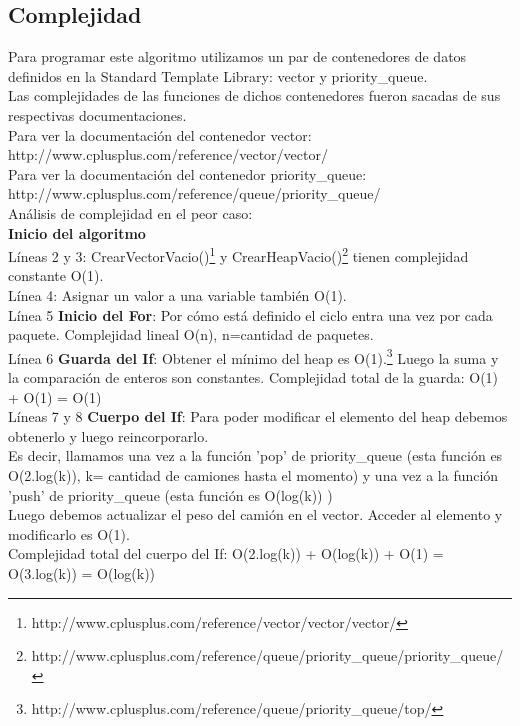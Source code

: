 \subsection{Complejidad}
Para programar este algoritmo utilizamos un par de contenedores de datos definidos en la Standard Template Library: vector y priority\_queue. \\
Las complejidades de las funciones de dichos contenedores fueron sacadas de sus respectivas documentaciones.\\

Para ver la documentación del contenedor vector:  http://www.cplusplus.com/reference/vector/vector/\\

Para ver la documentación del contenedor priority\_queue: 
http://www.cplusplus.com/reference/queue/priority\_queue/\\

Análisis de complejidad en el peor caso:\\

\textbf{Inicio del algoritmo}\\

Líneas 2 y 3: CrearVectorVacio()\footnote{http://www.cplusplus.com/reference/vector/vector/vector/}  y CrearHeapVacio()\footnote{http://www.cplusplus.com/reference/queue/priority\_queue/priority\_queue/}  tienen complejidad constante O(1).\\

Línea 4: Asignar un valor a una variable también O(1).\\

Línea 5 \textbf{Inicio del For}: Por cómo está definido el ciclo entra una vez por cada paquete. Complejidad lineal O(n), n=cantidad de paquetes.\\

Línea 6 \textbf{Guarda del If}: Obtener el mínimo del heap es O(1).\footnote{http://www.cplusplus.com/reference/queue/priority\_queue/top/} Luego la suma y la comparación de enteros son constantes. Complejidad total de la guarda: O(1) + O(1) = O(1)\\

Líneas 7 y 8 \textbf{Cuerpo del If}: Para poder modificar el elemento del heap debemos obtenerlo y luego reincorporarlo.\\
Es decir, llamamos una vez a la función 'pop' de priority\_queue (esta función es O(2.log(k)), k= cantidad de camiones hasta el momento) y una vez a la función 'push' de priority\_queue (esta función es O(log(k)) )\\
Luego debemos actualizar el peso del camión en el vector. Acceder al elemento y modificarlo es O(1).\\
Complejidad total del cuerpo del If: O(2.log(k)) + O(log(k)) + O(1) = O(3.log(k)) = O(log(k))\\

